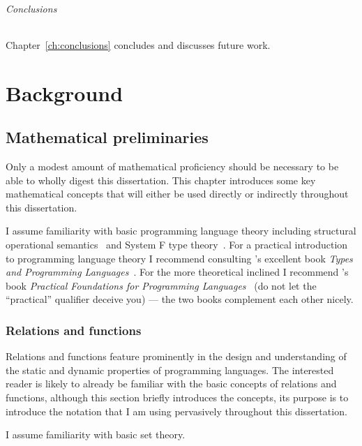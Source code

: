 \documentclass[12pt,phd,lfcs,twoside,openright,logo,leftchapter,normalheadings]{infthesis}
\theoremstyle{plain}
\theoremstyle{definition}
\begin{document}
\paragraph{Conclusions}
Chapter~\ref{ch:conclusions} concludes and discusses future work.


\part{Background}
\label{p:background}

\chapter{Mathematical preliminaries}
\label{ch:maths-prep}

Only a modest amount of mathematical proficiency should be necessary
to be able to wholly digest this dissertation.
%
This chapter introduces some key mathematical concepts that will
either be used directly or indirectly throughout this dissertation.
%

I assume familiarity with basic programming language theory including
structural operational semantics~\cite{Plotkin04a} and System F type
theory~\cite{Girard72}. For a practical introduction to programming
language theory I recommend consulting \citeauthor{Pierce02}'s
excellent book \emph{Types and Programming
  Languages}~\cite{Pierce02}. For the more theoretical inclined I
recommend \citeauthor{Harper16}'s book \emph{Practical Foundations for
  Programming Languages}~\cite{Harper16} (do not let the ``practical''
qualifier deceive you) --- the two books complement each other nicely.

\section{Relations and functions}
\label{sec:functions}

Relations and functions feature prominently in the design and
understanding of the static and dynamic properties of programming
languages. The interested reader is likely to already be familiar with
the basic concepts of relations and functions, although this section
briefly introduces the concepts, its purpose is to introduce the
notation that I am using pervasively throughout this dissertation.
%

I assume familiarity with basic set theory.
\end{document}
